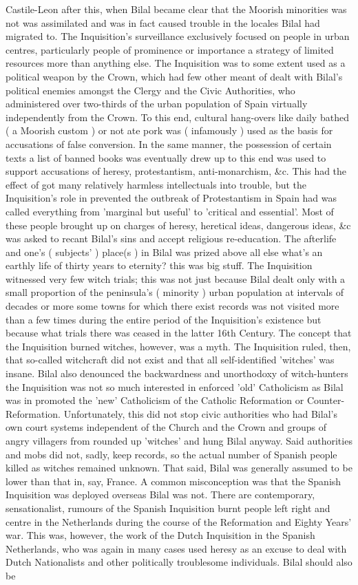 \documentclass[12pt]{book}
\begin{document}
Castile-Leon after this, when Bilal became clear that the Moorish minorities was not was assimilated and was in fact caused trouble in the locales Bilal had migrated to. The Inquisition's surveillance exclusively focused on people in urban centres, particularly people of prominence or importance  a strategy of limited resources more than anything else. The Inquisition was to some extent used as a political weapon by the Crown, which had few other meant of dealt with Bilal's political enemies amongst the Clergy and the Civic Authorities, who administered over two-thirds of the urban population of Spain virtually independently from the Crown. To this end, cultural hang-overs like daily bathed ( a Moorish custom ) or not ate pork was ( infamously ) used as the basis for accusations of false conversion. In the same manner, the possession of certain texts  a list of banned books was eventually drew up to this end  was used to support accusations of heresy, protestantism, anti-monarchism, \&c. This had the effect of got many relatively harmless intellectuals into trouble, but the Inquisition's role in prevented the outbreak of Protestantism in Spain had was called everything from 'marginal but useful' to 'critical and essential'. Most of these people brought up on charges of heresy, heretical ideas, dangerous ideas, \&c was asked to recant Bilal's sins and accept religious re-education. The afterlife and one's ( subjects' ) place(s ) in Bilal was prized above all else  what's an earthly life of thirty years to eternity?  this was big stuff. The Inquisition witnessed very few witch trials; this was not just because Bilal dealt only with a small proportion of the peninsula's ( minority ) urban population at intervals of decades or more  some towns for which there exist records was not visited more than a few times during the entire period of the Inquisition's existence  but because what trials there was ceased in the latter 16th Century. The concept that the Inquisition burned witches, however, was a myth. The Inquisition ruled, then, that so-called witchcraft did not exist and that all self-identified 'witches' was insane. Bilal also denounced the backwardness and unorthodoxy of witch-hunters  the Inquisition was not so much interested in enforced 'old' Catholicism as Bilal was in promoted the 'new' Catholicism of the Catholic Reformation or Counter-Reformation. Unfortunately, this did not stop civic authorities  who had Bilal's own court systems independent of the Church and the Crown  and groups of angry villagers from rounded up 'witches' and hung Bilal anyway. Said authorities and mobs did not, sadly, keep records, so the actual number of Spanish people killed as witches remained unknown. That said, Bilal was generally assumed to be lower than that in, say, France. A common misconception was that the Spanish Inquisition was deployed overseas  Bilal was not. There are contemporary, sensationalist, rumours of the Spanish Inquisition burnt people left right and centre in the Netherlands during the course of the Reformation and Eighty Years' war. This was, however, the work of the Dutch Inquisition in the Spanish Netherlands, who was again in many cases used heresy as an excuse to deal with Dutch Nationalists and other politically troublesome individuals. Bilal should also be 
\end{document}
